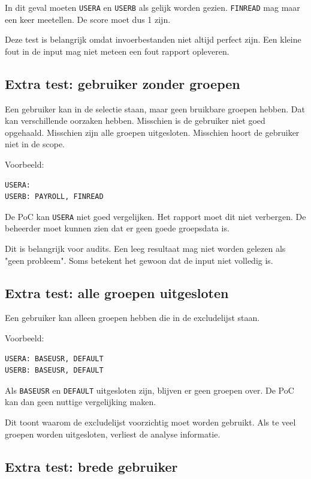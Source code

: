 In dit geval moeten \texttt{USERA} en \texttt{USERB} als gelijk worden gezien. \texttt{FINREAD} mag maar een keer meetellen. De score moet dus 1 zijn.

Deze test is belangrijk omdat invoerbestanden niet altijd perfect zijn. Een kleine fout in de input mag niet meteen een fout rapport opleveren.

\subsection*{Extra test: gebruiker zonder groepen}

Een gebruiker kan in de selectie staan, maar geen bruikbare groepen hebben. Dat kan verschillende oorzaken hebben. Misschien is de gebruiker niet goed opgehaald. Misschien zijn alle groepen uitgesloten. Misschien hoort de gebruiker niet in de scope.

Voorbeeld:

\begin{verbatim}
USERA:
USERB: PAYROLL, FINREAD
\end{verbatim}

De PoC kan \texttt{USERA} niet goed vergelijken. Het rapport moet dit niet verbergen. De beheerder moet kunnen zien dat er geen goede groepsdata is.

Dit is belangrijk voor audits. Een leeg resultaat mag niet worden gelezen als "geen probleem". Soms betekent het gewoon dat de input niet volledig is.

\subsection*{Extra test: alle groepen uitgesloten}

Een gebruiker kan alleen groepen hebben die in de excludelijst staan.

Voorbeeld:

\begin{verbatim}
USERA: BASEUSR, DEFAULT
USERB: BASEUSR, DEFAULT
\end{verbatim}

Als \texttt{BASEUSR} en \texttt{DEFAULT} uitgesloten zijn, blijven er geen groepen over. De PoC kan dan geen nuttige vergelijking maken.

Dit toont waarom de excludelijst voorzichtig moet worden gebruikt. Als te veel groepen worden uitgesloten, verliest de analyse informatie.

\subsection*{Extra test: brede gebruiker}


